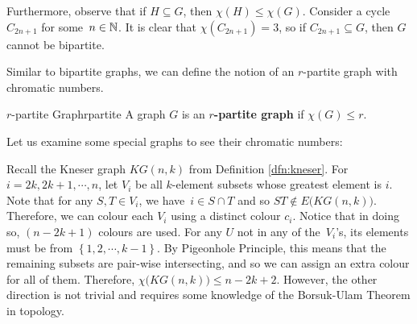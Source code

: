 \documentclass[math]{amznotes}
\makeatletter
\let\save@mathaccent\mathaccent
\newcommand*\if@single[3]{%
  \setbox0\hbox{${\mathaccent"0362{#1}}^H$}%
  \setbox2\hbox{${\mathaccent"0362{\kern0pt#1}}^H$}%
  \ifdim\ht0=\ht2 #3\else #2\fi
  }
\newcommand*\rel@kern[1]{\kern#1\dimexpr\macc@kerna}
\newcommand*\widebar[1]{\@ifnextchar^{{\wide@bar{#1}{0}}}{\wide@bar{#1}{1}}}
\newcommand*\wide@bar[2]{\if@single{#1}{\wide@bar@{#1}{#2}{1}}{\wide@bar@{#1}{#2}{2}}}
\newcommand*\wide@bar@[3]{%
  \begingroup
  \def\mathaccent##1##2{%
    \let\mathaccent\save@mathaccent
    \if#32 \let\macc@nucleus\first@char \fi
    \setbox\z@\hbox{$\macc@style{\macc@nucleus}_{}$}%
    \setbox\tw@\hbox{$\macc@style{\macc@nucleus}{}_{}$}%
    \dimen@\wd\tw@
    \advance\dimen@-\wd\z@
    \divide\dimen@ 3
    \@tempdima\wd\tw@
    \advance\@tempdima-\scriptspace
    \divide\@tempdima 10
    \advance\dimen@-\@tempdima
    \ifdim\dimen@>\z@ \dimen@0pt\fi
    \rel@kern{0.6}\kern-\dimen@
    \if#31
      \overline{\rel@kern{-0.6}\kern\dimen@\macc@nucleus\rel@kern{0.4}\kern\dimen@}%
      \advance\dimen@0.4\dimexpr\macc@kerna
      \let\final@kern#2%
      \ifdim\dimen@<\z@ \let\final@kern1\fi
      \if\final@kern1 \kern-\dimen@\fi
    \else
      \overline{\rel@kern{-0.6}\kern\dimen@#1}%
    \fi
  }%
  \macc@depth\@ne
  \let\math@bgroup\@empty \let\math@egroup\macc@set@skewchar
  \mathsurround\z@ \frozen@everymath{\mathgroup\macc@group\relax}%
  \macc@set@skewchar\relax
  \let\mathaccentV\macc@nested@a
  \if#31
    \macc@nested@a\relax111{#1}%
  \else
    \def\gobble@till@marker##1\endmarker{}%
    \futurelet\first@char\gobble@till@marker#1\endmarker
    \ifcat\noexpand\first@char A\else
      \def\first@char{}%
    \fi
    \macc@nested@a\relax111{\first@char}%
  \fi
  \endgroup
}
\theoremstyle{remark}
\makeatother
\begin{document}
Furthermore, observe that if $H \subseteq G$, then $\chi(H) \leq \chi(G)$. Consider a cycle $C_{2n + 1}$ for some~$n \in \mathbb{N}$. It is clear that $\chi(C_{2n + 1}) = 3$, so if $C_{2n + 1} \subseteq G$, then $G$ cannot be bipartite.

Similar to bipartite graphs, we can define the notion of an $r$-partite graph with chromatic numbers.
\begin{dfnbox}{$r$-partite Graph}{rpartite}
    A graph $G$ is an {\color{red} \textbf{$r$-partite graph}} if $\chi(G) \leq r$.
\end{dfnbox}
Let us examine some special graphs to see their chromatic numbers:
Recall the Kneser graph $KG(n, k)$ from Definition \ref{dfn:kneser}. For $i = 2k, 2k + 1, \cdots, n$, let $V_i$ be all $k$-element subsets whose greatest element is $i$. Note that for any $S, T \in V_i$, we have~$i \in S \cap T$ and so $ST \notin E\bigl(KG(n, k)\bigr)$. Therefore, we can colour each $V_i$ using a distinct colour $c_i$. Notice that in doing so, $(n - 2k + 1)$ colours are used. For any $U$ not in any of the~$V_i$'s, its elements must be from $\left\{1, 2, \cdots, k - 1\right\}$. By Pigeonhole Principle, this means that the remaining subsets are pair-wise intersecting, and so we can assign an extra colour for all of them. Therefore, $\chi\bigl(KG(n, k)\bigr) \leq n - 2k + 2$. However, the other direction is not trivial and requires some knowledge of the Borsuk-Ulam Theorem in topology.
\end{document}
